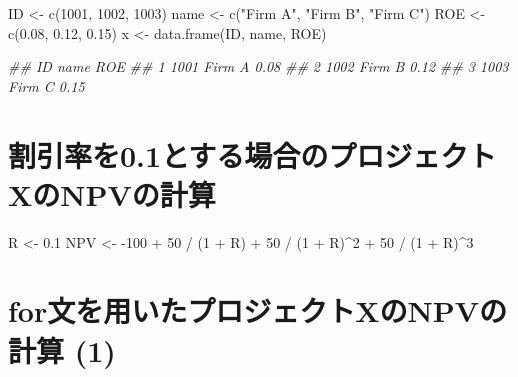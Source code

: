 \documentclass[
  letterpaper,
  DIV=11,
  numbers=noendperiod]{scrreprt}
\newenvironment{Shaded}{\begin{snugshade}}{\end{snugshade}}
\newcommand{\DecValTok}[1]{\textcolor[rgb]{0.68,0.00,0.00}{#1}}
\newcommand{\DocumentationTok}[1]{\textcolor[rgb]{0.37,0.37,0.37}{\textit{#1}}}
\newcommand{\FloatTok}[1]{\textcolor[rgb]{0.68,0.00,0.00}{#1}}
\newcommand{\FunctionTok}[1]{\textcolor[rgb]{0.28,0.35,0.67}{#1}}
\newcommand{\NormalTok}[1]{\textcolor[rgb]{0.00,0.23,0.31}{#1}}
\newcommand{\OtherTok}[1]{\textcolor[rgb]{0.00,0.23,0.31}{#1}}
\newcommand{\SpecialCharTok}[1]{\textcolor[rgb]{0.37,0.37,0.37}{#1}}
\newcommand{\StringTok}[1]{\textcolor[rgb]{0.13,0.47,0.30}{#1}}
\begin{document}
\begin{Shaded}
\begin{Highlighting}[]
\NormalTok{ID }\OtherTok{\textless{}{-}} \FunctionTok{c}\NormalTok{(}\DecValTok{1001}\NormalTok{, }\DecValTok{1002}\NormalTok{, }\DecValTok{1003}\NormalTok{)}
\NormalTok{name }\OtherTok{\textless{}{-}} \FunctionTok{c}\NormalTok{(}\StringTok{"Firm A"}\NormalTok{, }\StringTok{"Firm B"}\NormalTok{, }\StringTok{"Firm C"}\NormalTok{)}
\NormalTok{ROE }\OtherTok{\textless{}{-}} \FunctionTok{c}\NormalTok{(}\FloatTok{0.08}\NormalTok{, }\FloatTok{0.12}\NormalTok{, }\FloatTok{0.15}\NormalTok{)}
\NormalTok{x }\OtherTok{\textless{}{-}} \FunctionTok{data.frame}\NormalTok{(ID, name, ROE)}

\DocumentationTok{\#\#     ID   name  ROE}
\DocumentationTok{\#\# 1 1001 Firm A 0.08}
\DocumentationTok{\#\# 2 1002 Firm B 0.12}
\DocumentationTok{\#\# 3 1003 Firm C 0.15}
\end{Highlighting}
\end{Shaded}

\section{割引率を0.1とする場合のプロジェクトXのNPVの計算}\label{ux5272ux5f15ux7387ux30920.1ux3068ux3059ux308bux5834ux5408ux306eux30d7ux30edux30b8ux30a7ux30afux30c8xux306enpvux306eux8a08ux7b97}

\begin{Shaded}
\begin{Highlighting}[]
\NormalTok{R }\OtherTok{\textless{}{-}} \FloatTok{0.1}
\NormalTok{NPV }\OtherTok{\textless{}{-}} \SpecialCharTok{{-}}\DecValTok{100} \SpecialCharTok{+} \DecValTok{50} \SpecialCharTok{/}\NormalTok{ (}\DecValTok{1} \SpecialCharTok{+}\NormalTok{ R) }\SpecialCharTok{+} \DecValTok{50} \SpecialCharTok{/}\NormalTok{ (}\DecValTok{1} \SpecialCharTok{+}\NormalTok{ R)}\SpecialCharTok{\^{}}\DecValTok{2} \SpecialCharTok{+} \DecValTok{50} \SpecialCharTok{/}\NormalTok{ (}\DecValTok{1} \SpecialCharTok{+}\NormalTok{ R)}\SpecialCharTok{\^{}}\DecValTok{3}
\end{Highlighting}
\end{Shaded}

\section{for文を用いたプロジェクトXのNPVの計算
(1)}\label{forux6587ux3092ux7528ux3044ux305fux30d7ux30edux30b8ux30a7ux30afux30c8xux306enpvux306eux8a08ux7b97-1}
\end{document}
